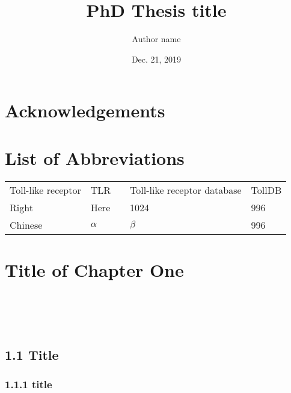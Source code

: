 \documentclass[a4paper,12pt,UTF8,openright]{book}
\title{\Huge \bfseries PhD Thesis title}
\author{Author name}
\date{Dec. 21, 2019}
\begin{document}
\begin{titlepage}
\maketitle
\thispagestyle{empty}
\end{titlepage}

\tableofcontents
\thispagestyle{empty}

\newpage
\thispagestyle{empty}

\frontmatter
\chapter*{Acknowledgements}
\lipsum[1-5]

\chapter*{List of Abbreviations}

\begin{tabular}{p{}p{}||p{}p{}p{}}
	Toll-like receptor & TLR & &Toll-like receptor database & TollDB \\
	Right    & Here      & & 1024 & 996 \\
	Chinese  & $\alpha$  & & $\beta$  & 996 \\
\end{tabular}

\mainmatter
\chapter{Title of Chapter One}

 \\
 \\
 \\

\lipsum[1-5]

\section{1.1 Title}
\lipsum[1-10]

\subsection{1.1.1 title}
\lipsum[1-5]
\end{document}
